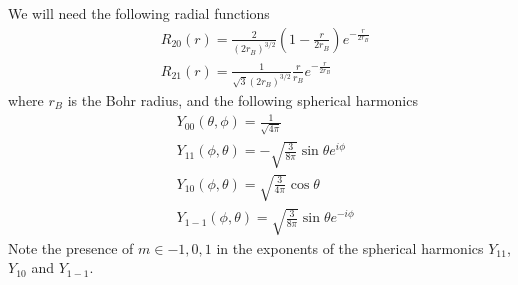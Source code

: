\documentclass[11pt, a4paper]{article}
\begin{document}
\begin{itemize}
	We will need the following radial functions
	\begin{align*}
		& R_{20}(r) = \frac{2}{(2r_{B})^{3/2}}\left(1 - \frac{r}{2r_{B}}\right)e^{-\frac{r}{2r_{B}}}\\
		& R_{21}(r) = \frac{1}{\sqrt{3}(2r_{B})^{3/2}}\frac{r}{r_{B}}e^{-\frac{r}{2r_{B}}}
	\end{align*}
	where $ r_{B} $ is the Bohr radius, and the following spherical harmonics
	\begin{align*}
		& Y_{00}(\theta, \phi) = \frac{1}{\sqrt{4\pi}}	\\
		& Y_{11}(\phi, \theta) = - \sqrt{\frac{3}{8\pi}}\sin \theta e^{i \phi}	\\
		& Y_{10}(\phi, \theta) = \sqrt{\frac{3}{4\pi}}\cos \theta	\\
		& Y_{1-1}(\phi, \theta)	 = \sqrt{\frac{3}{8\pi}}\sin \theta e^{-i\phi}
	\end{align*}
	Note the presence of $ m \in {-1, 0, 1} $ in the exponents of the spherical harmonics $ Y_{11} $, $ Y_{10} $ and $ Y_{1-1} $.
\end{itemize}
	
\end{document}

